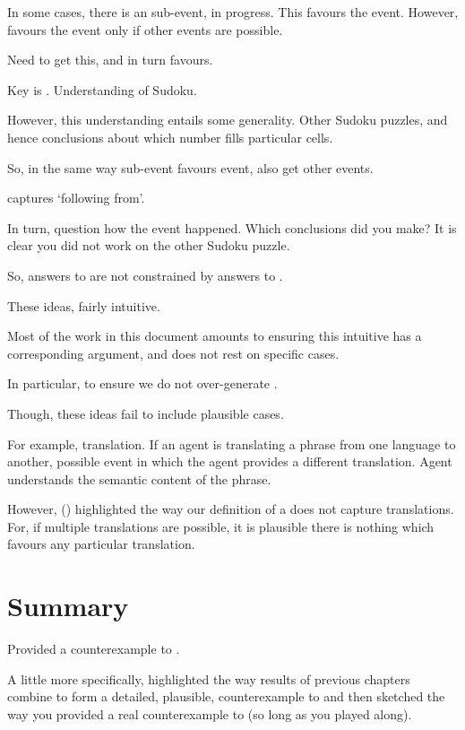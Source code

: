 \begin{note}
  In some cases, there is an sub-event, in progress.
  This favours the event.
  However, favours the event only if other events are possible.

  
  Need to get this, and in turn favours.

  Key is \pool{}.
  Understanding of Sudoku.

  However, this understanding entails some generality.
  Other Sudoku puzzles, and hence conclusions about which number fills particular cells.

  So, in the same way sub-event favours event, also get other events.

  \ros{} captures `following from'.

  In turn, \qHow{} question how the event happened.
  Which conclusions did you make?
  It is clear you did not work on the other Sudoku puzzle.

  So, answers to \qWhy{} are not constrained by answers to \qHow{}.
\end{note}


\begin{note}
  These ideas, fairly intuitive.

  Most of the work in this document amounts to ensuring this intuitive has a corresponding argument, and does not rest on specific cases.

  In particular,  to ensure we do not over-generate .

  Though, these ideas fail to include plausible cases.

  For example, translation.
  If an agent is translating a phrase from one language to another, possible event in which the agent provides a different translation.
  Agent understands the semantic content of the phrase.

  However,  () highlighted the way our definition of a  does not capture translations.
  For, if multiple translations are possible, it is plausible there is nothing which favours any particular translation.
\end{note}





\section*{Summary}
\label{sec:summary-1}

\begin{note}
  Provided a counterexample to \issueInclusion{}.

  A little more specifically, highlighted the way results of previous chapters combine to form a detailed, plausible, counterexample to \issueConstraint{} and then sketched the way you provided a real counterexample to \issueConstraint{} (so long as you played along).
\end{note}




